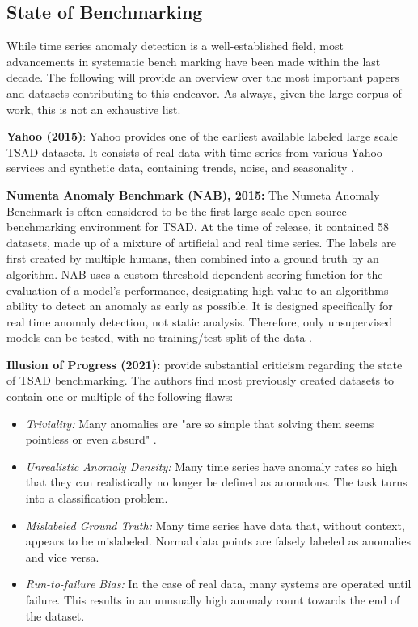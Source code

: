 \documentclass[12pt,oneside]{article}
\begin{document}
\textbf{}


\subsection{State of Benchmarking}

While time series anomaly detection is a well-established field, most advancements in systematic bench marking have been made within the last decade. The following will provide an overview over the most important papers and datasets contributing to this endeavor. As always, given the large corpus of work, this is not an exhaustive list.  \par
\textbf{Yahoo (2015)}: Yahoo provides one of the earliest available labeled large scale TSAD datasets. It consists of real data with time series from various Yahoo services and synthetic data, containing trends, noise, and seasonality \parencite{Yahoo}. \par
\textbf{Numenta Anomaly Benchmark (NAB), 2015:} The Numeta Anomaly Benchmark is often considered to be the first large scale open source benchmarking environment for TSAD. At the time of release, it contained 58 datasets, made up of a mixture of artificial and real time series. The labels are first created by multiple humans, then combined into a ground truth by an algorithm. NAB uses a custom threshold dependent scoring function for the evaluation of a model's performance, designating high value to an algorithms ability to detect an anomaly as early as possible. It is designed specifically for real time anomaly detection, not static analysis. Therefore, only unsupervised models can be tested, with no training/test split of the data \parencites{Lavin_2015}.\par
\textbf{Illusion of Progress (2021):} \cite{wu2021current} provide substantial criticism regarding the state of TSAD benchmarking. The authors find most previously created datasets to contain one or multiple of the following flaws:
\begin{itemize}
    \item \textit{Triviality:} Many anomalies are "are so simple that solving them seems pointless or even absurd" \parencites[p.~2]{wu2021current}.
    \item \textit{Unrealistic Anomaly Density:} Many time series have anomaly rates so high that they can realistically no longer be defined as anomalous. The task turns into a classification problem.
    \item \textit{Mislabeled Ground Truth:} Many time series have data that, without context, appears to be mislabeled. Normal data points are falsely labeled as anomalies and vice versa.
    \item \textit{Run-to-failure Bias:} In the case of real data, many systems are operated until failure. This results in an unusually high anomaly count towards the end of the dataset.
\end{itemize}
\end{document}
